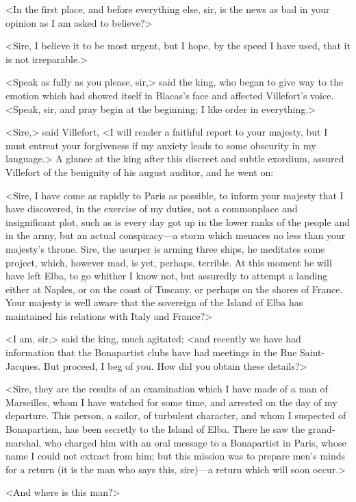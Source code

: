 <In the first place, and before everything else, sir, is the news as bad in your opinion as I am asked to believe?> 

 <Sire, I believe it to be most urgent, but I hope, by the speed I have used, that it is not irreparable.> 

 <Speak as fully as you please, sir,> said the king, who began to give way to the emotion which had showed itself in Blacas's face and affected Villefort's voice. <Speak, sir, and pray begin at the beginning; I like order in everything.> 

 <Sire,> said Villefort, <I will render a faithful report to your majesty, but I must entreat your forgiveness if my anxiety leads to some obscurity in my language.> A glance at the king after this discreet and subtle exordium, assured Villefort of the benignity of his august auditor, and he went on: 

 <Sire, I have come as rapidly to Paris as possible, to inform your majesty that I have discovered, in the exercise of my duties, not a commonplace and insignificant plot, such as is every day got up in the lower ranks of the people and in the army, but an actual conspiracy—a storm which menaces no less than your majesty's throne. Sire, the usurper is arming three ships, he meditates some project, which, however mad, is yet, perhaps, terrible. At this moment he will have left Elba, to go whither I know not, but assuredly to attempt a landing either at Naples, or on the coast of Tuscany, or perhaps on the shores of France. Your majesty is well aware that the sovereign of the Island of Elba has maintained his relations with Italy and France?> 

 <I am, sir,> said the king, much agitated; <and recently we have had information that the Bonapartist clubs have had meetings in the Rue Saint-Jacques. But proceed, I beg of you. How did you obtain these details?> 

 <Sire, they are the results of an examination which I have made of a man of Marseilles, whom I have watched for some time, and arrested on the day of my departure. This person, a sailor, of turbulent character, and whom I suspected of Bonapartism, has been secretly to the Island of Elba. There he saw the grand-marshal, who charged him with an oral message to a Bonapartist in Paris, whose name I could not extract from him; but this mission was to prepare men's minds for a return (it is the man who says this, sire)—a return which will soon occur.> 

 <And where is this man?> 

